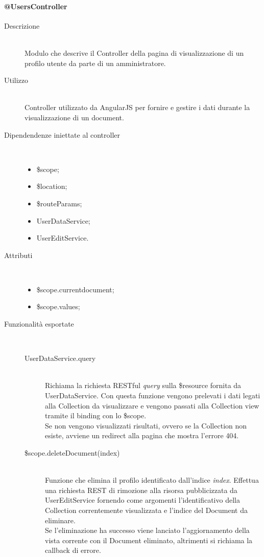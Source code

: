 \paragraph{@UsersController}
\begin{description}
 \item[Descrizione] \hfill \\
 Modulo che descrive il Controller della pagina di visualizzazione di un profilo utente da parte di un amministratore.
 
 \item[Utilizzo] \hfill \\
 Controller utilizzato da AngularJS per fornire e gestire i dati durante la visualizzazione di un document.
 
 \item[Dipendendenze iniettate al controller] \hfill \\
 \begin{itemize}
  \item \$scope;
  \item \$location;
  \item \$routeParams;
  \item UserDataService;
  \item UserEditService.
  
 \end{itemize}
 
 \item[Attributi] \hfill \\
 \begin{itemize}
  \item \$scope.current\textunderscore document;
  \item  \$scope.values;
 \end{itemize}
 
 \item[Funzionalità esportate] \hfill \\
 \begin{description}
  \item[UserDataService.query] \hfill \\
  Richiama la richiesta RESTful \textit{query} sulla \$resource fornita da UserDataService.
  Con questa funzione vengono prelevati i dati legati alla Collection da visualizzare e vengono
  passati alla Collection view tramite il binding con lo \$scope. \\
  Se non vengono visualizzati risultati, ovvero se la Collection non esiste, avviene un redirect alla pagina
  che mostra l'errore 404.
  
  \item[\$scope.deleteDocument(index)] \hfill \\
  Funzione che elimina il profilo identificato dall'indice \emph{index}. Effettua una richiesta REST di rimozione alla risorsa
  pubblicizzata da UserEditService fornendo come argomenti l'identificativo della Collection correntemente visualizzata e l'indice
  del Document da eliminare. \\
  Se l'eliminazione ha successo viene lanciato l'aggiornamento della vista corrente con il Document eliminato, altrimenti si
  richiama la callback di errore.
 \end{description}
\end{description}

